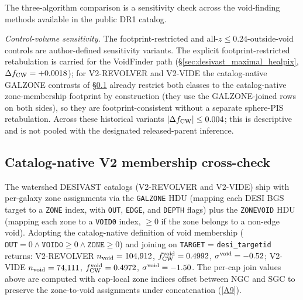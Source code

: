 \documentclass[aps,prd,twocolumn,superscriptaddress,showpacs,preprintnumbers,nofootinbib,longbibliography,floatfix]{revtex4-2}
\newcommand{\repoBase}{https://github.com/Hubify-Projects/bigbounce/blob/main}
\begin{document}
The three-algorithm comparison is a sensitivity check across the
void-finding methods available in the public DR1 catalog.

\emph{Control-volume sensitivity.} The footprint-restricted and
all-$z\le0.24$-outside-void controls are author-defined sensitivity
variants. The explicit footprint-restricted retabulation is
carried for the VoidFinder path
(\S\ref{sec:desivast_maximal_healpix}, $\Delta f_{\rm CW} = +0.0018$);
for V2-REVOLVER and V2-VIDE the catalog-native GALZONE contrasts of
\S\ref{sec:desivast_catalog_native} already restrict both classes to the
catalog-native zone-membership footprint by construction (they use the
GALZONE-joined rows on both sides), so they are footprint-consistent
without a separate sphere-PIS retabulation. Across these historical
variants $|\Delta f_{\rm CW}| \le 0.004$; this is descriptive and is
not pooled with the designated released-parent inference.

\subsection{Catalog-native V2 membership cross-check}\label{sec:desivast_catalog_native}

The watershed
DESIVAST catalogs (V2-REVOLVER and V2-VIDE) ship with per-galaxy zone
assignments via the \texttt{GALZONE} HDU (mapping each DESI BGS target
to a \texttt{ZONE} index, with \texttt{OUT}, \texttt{EDGE}, and
\texttt{DEPTH} flags) plus the \texttt{ZONEVOID} HDU (mapping each
zone to a \texttt{VOID0} index, $\geq 0$ if the zone belongs to a
non-edge void). Adopting the catalog-native definition of void
membership ($\texttt{OUT} = 0 \wedge \texttt{VOID0} \geq 0 \wedge
\texttt{ZONE} \geq 0$) and joining on \texttt{TARGET} =
\texttt{desi\_targetid} returns: V2-REVOLVER $n_{\rm void} = 104{,}912$,
$f_{\rm CW}^{\rm void} = 0.4992$, $\sigma^{\rm void} = -0.52$; V2-VIDE
$n_{\rm void} = 74{,}111$, $f_{\rm CW}^{\rm void} = 0.4972$,
$\sigma^{\rm void} = -1.50$. The per-cap join values above are computed
with cap-local zone indices offset between NGC and SGC to preserve the
zone-to-void assignments under concatenation
(\href{\repoBase/pipelines/p5\_desi\_chirality/outputs/22\_r24conf\_local\_batch.json}{[A9]}).
\end{document}
